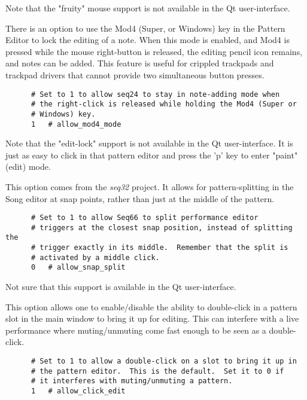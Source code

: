    Note that the "fruity" mouse support is not available in the Qt
   user-interface.

   There is an option to use the Mod4 (Super, or Windows) key in the
   Pattern Editor to lock the editing of a note.  When this mode is enabled,
   and Mod4 is pressed while the mouse right-button is released, the
   editing pencil icon remains, and notes can be added.  This feature is
   useful for crippled trackpads and trackpad drivers that cannot provide
   two simultaneous button presses.

   \begin{verbatim}
      # Set to 1 to allow seq24 to stay in note-adding mode when
      # the right-click is released while holding the Mod4 (Super or
      # Windows) key.
      1   # allow_mod4_mode
   \end{verbatim}

   Note that the "edit-lock" support is not available in the Qt
   user-interface.  It is just as easy to click in that pattern editor and
   press the 'p' key to enter "paint" (edit) mode.

   This option comes from the \textsl{seq32} project.  It allows for
   pattern-splitting in the Song editor at snap points, rather than just
   at the middle of the pattern.

   \begin{verbatim}
      # Set to 1 to allow Seq66 to split performance editor
      # triggers at the closest snap position, instead of splitting the
      # trigger exactly in its middle.  Remember that the split is
      # activated by a middle click.
      0   # allow_snap_split
   \end{verbatim}

   Not sure that this support is available in the Qt user-interface.

   This option allows one to enable/disable the ability to double-click
   in a pattern slot in the main window to bring it up for editing.  This
   can interfere with a live performance where muting/unmuting come fast enough
   to be seen as a double-click.

   \begin{verbatim}
      # Set to 1 to allow a double-click on a slot to bring it up in
      # the pattern editor.  This is the default.  Set it to 0 if
      # it interferes with muting/unmuting a pattern.
      1   # allow_click_edit
   \end{verbatim}

